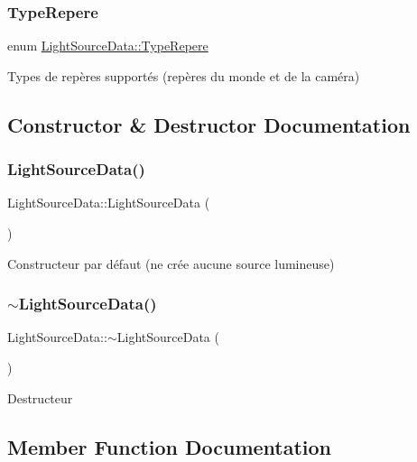 \subsubsection{\texorpdfstring{TypeRepere}{TypeRepere}}
{\footnotesize\ttfamily enum \mbox{\hyperlink{classLightSourceData_abdbcb37900b8147487551a3afcdd90f5}{Light\+Source\+Data\+::\+Type\+Repere}}\hspace{0.3cm}{\ttfamily [strong]}}

Types de repères supportés (repères du monde et de la caméra) 

\subsection{Constructor \& Destructor Documentation}
\mbox{\label{classLightSourceData_a0862cd4423045f379a724594f5a7f7f2}} 
\subsubsection{\texorpdfstring{LightSourceData()}{LightSourceData()}}
{\footnotesize\ttfamily Light\+Source\+Data\+::\+Light\+Source\+Data (\begin{DoxyParamCaption}{ }\end{DoxyParamCaption})}

Constructeur par défaut (ne crée aucune source lumineuse) \mbox{\label{classLightSourceData_a6b7b1d0213c0aa6eccf9a521794aca9f}} 
\subsubsection{\texorpdfstring{$\sim$LightSourceData()}{~LightSourceData()}}
{\footnotesize\ttfamily Light\+Source\+Data\+::$\sim$\+Light\+Source\+Data (\begin{DoxyParamCaption}{ }\end{DoxyParamCaption})\hspace{0.3cm}{\ttfamily [default]}}

Destructeur 

\subsection{Member Function Documentation}
\mbox{\label{classLightSourceData_a29ba01a39c4a04d379bc3b437faae198}} 
